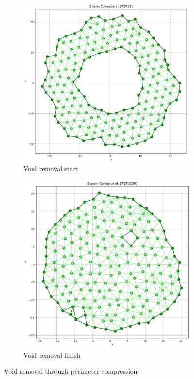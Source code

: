 \documentclass[12pt,a4paper]{IEEEtran}
\begin{document}
\begin{figure}
\centering
\begin{subfigure}{0.4\textwidth}
	\centering	
	\includegraphics[width=1.0\linewidth]{figures/voidRemoval1}
	\caption[Void removal start]{Void removal start}
	\label{fig:voidRemovalStart}
\end{subfigure}
\begin{subfigure}{0.4\textwidth}
	\centering
	\includegraphics[width=1.0\linewidth]{figures/voidRemoval2}
	\caption[Void removal finish]{Void removal finish}
	\label{fig:voidRemovalFinish}
\end{subfigure}
\caption{Void removal through perimeter compression}
\label{fig:voidRemoval}
\end{figure}
\end{document}
